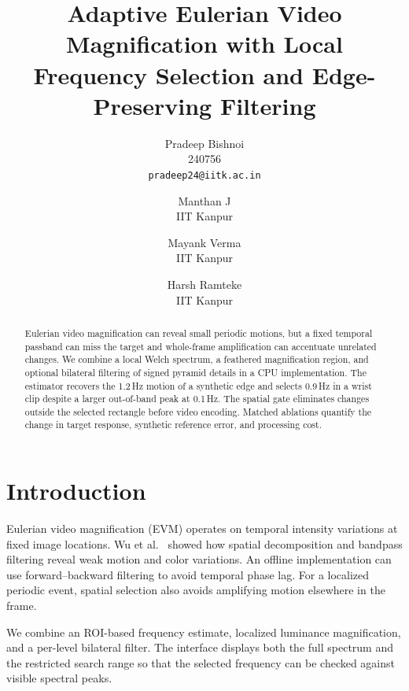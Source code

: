\documentclass[10pt,twocolumn,letterpaper]{article}
\begin{document}
\title{Adaptive Eulerian Video Magnification with Local Frequency Selection and Edge-Preserving Filtering}
\author{Pradeep Bishnoi\\
240756\\
{\tt\small pradeep24@iitk.ac.in}
\and
Manthan J\\
IIT Kanpur\\
\and
Mayank Verma\\
IIT Kanpur\\
\and
Harsh Ramteke\\
IIT Kanpur\\
}


\maketitle

\begin{abstract}
Eulerian video magnification can reveal small periodic motions, but a fixed
temporal passband can miss the target and whole-frame amplification can
accentuate unrelated changes. We combine a local Welch spectrum, a feathered
magnification region, and optional bilateral filtering of signed pyramid
details in a CPU implementation. The estimator recovers the 1.2\,Hz motion of
a synthetic edge and selects 0.9\,Hz in a wrist clip despite a larger
out-of-band peak at 0.1\,Hz. The spatial gate eliminates changes outside the
selected rectangle before video encoding. Matched ablations quantify the
change in target response, synthetic reference error, and processing cost.
\end{abstract}

\section{Introduction}
Eulerian video magnification (EVM) operates on temporal intensity variations
at fixed image locations. Wu et al.~\cite{wu2012eulerian} showed how spatial
decomposition and bandpass filtering reveal weak motion and color variations.
An offline implementation can use forward--backward filtering to avoid
temporal phase lag. For a localized periodic event, spatial selection also
avoids amplifying motion elsewhere in the frame.

We combine an ROI-based frequency estimate, localized luminance
magnification, and a per-level bilateral filter. The interface displays both
the full spectrum and the restricted search range so that the selected
frequency can be checked against visible spectral peaks.
\end{document}
